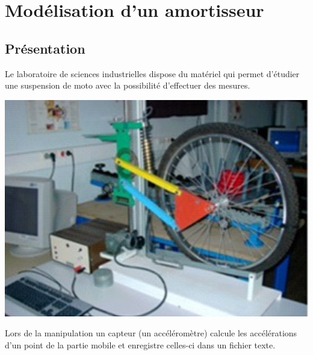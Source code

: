 \chapter{Modélisation d'un amortisseur}
\thispagestyle{empty}
\section{Présentation}
Le laboratoire de sciences industrielles dispose du matériel qui permet d'étudier une suspension de moto avec la possibilité d'effectuer des mesures.

\begin{center}
\includegraphics[scale=0.4]{Images/14_dispositif}
\end{center}

Lors de la manipulation un capteur (un accéléromètre) calcule les accélérations d'un point de la partie mobile et enregistre celles-ci dans un fichier texte.

